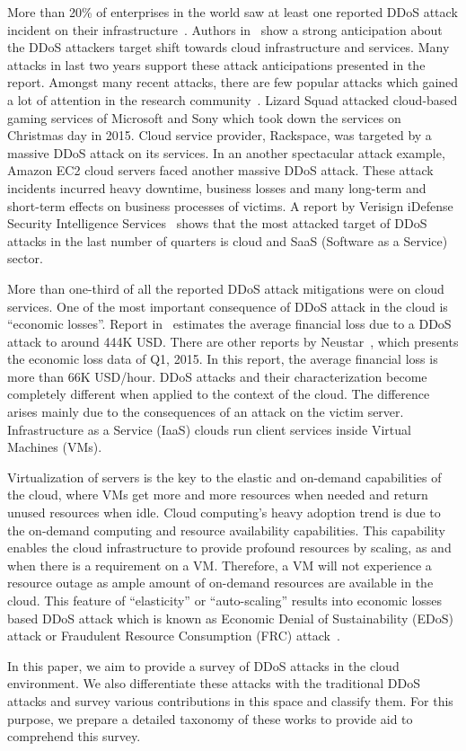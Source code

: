 \documentclass[final,5p,times,twocolumn]{elsarticle}
\begin{document}
\par More than 20\% of enterprises in the world saw at least one reported DDoS attack incident on their infrastructure~\cite{kaspersky}. Authors in~\cite{cloudddosnews} show a strong anticipation about the DDoS attackers target shift towards cloud infrastructure and services. Many attacks in last two years support these attack anticipations presented in the report. Amongst many recent attacks, there are few popular attacks which gained a lot of attention in the research community~\cite{cloudddosnews}. Lizard Squad attacked cloud-based gaming services of Microsoft and Sony which took down the services on Christmas day in 2015. Cloud service provider, Rackspace, was targeted by a massive DDoS attack on its services. In an another spectacular attack example, Amazon EC2 cloud servers faced another massive DDoS attack. These attack incidents incurred heavy downtime, business losses and many long-term and short-term effects on business processes of victims.  A report by Verisign iDefense Security Intelligence Services~\cite{2015targetingcloud} shows that the most attacked target of DDoS attacks in the last number of quarters is cloud and SaaS (Software as a Service) sector. 

\noindent More than one-third of all the reported DDoS attack mitigations were on cloud services. {One of the most important consequence of DDoS attack in the cloud is ``economic losses''. Report in~\cite{kaspersky} estimates the average financial loss due to a DDoS attack to around 444K USD. There are other reports by Neustar~\cite{economiclosses}, which presents the economic loss data of Q1, 2015. In this report, the average financial loss is more than 66K USD/hour.} DDoS attacks and their characterization become completely different when applied to the context of the cloud. The difference arises mainly due to the consequences of an attack on the victim server. Infrastructure as a Service (IaaS) clouds run client services inside Virtual Machines (VMs).
\par Virtualization of servers is the key to the elastic and on-demand capabilities of the cloud, where VMs get more and more resources when needed and return unused resources when idle. Cloud computing's heavy adoption trend is due to the on-demand computing and resource availability capabilities. This capability enables the cloud infrastructure to provide profound resources by scaling, as and when there is a requirement on a VM. Therefore, a VM will not experience a resource outage as ample amount of on-demand resources are available in the cloud. This feature of ``elasticity'' or ``auto-scaling'' results into economic losses based DDoS attack which is known as Economic Denial of Sustainability (EDoS) attack or Fraudulent Resource Consumption (FRC) attack~\cite{cohen}. 
\par In this paper, we aim to provide a survey of DDoS attacks in the cloud environment. We also differentiate these attacks with the traditional DDoS attacks and survey various contributions in this space and classify them. For this purpose, we prepare a detailed taxonomy of these works to provide aid to comprehend this survey.
\end{document}

